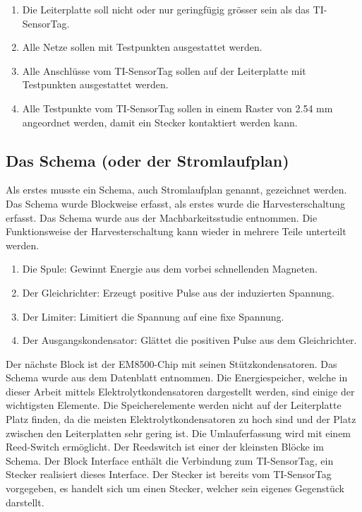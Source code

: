 \begin{enumerate}
    \item Die Leiterplatte soll nicht oder nur geringfügig grösser sein als das TI-SensorTag.
    
    \item Alle Netze sollen mit Testpunkten ausgestattet werden.
    
    \item Alle Anschlüsse vom TI-SensorTag sollen auf der Leiterplatte mit Testpunkten ausgestattet werden.
    
    \item Alle Testpunkte vom TI-SensorTag sollen in einem Raster von 2.54 mm angeordnet werden, damit ein Stecker kontaktiert werden kann.
    
\end{enumerate}
	


\subsection{Das Schema (oder der Stromlaufplan)}
Als erstes musste ein Schema, auch Stromlaufplan genannt, gezeichnet werden. Das Schema wurde Blockweise erfasst, als erstes wurde die Harvesterschaltung erfasst. Das Schema wurde aus der Machbarkeitsstudie entnommen. Die Funktionsweise der Harvesterschaltung kann wieder in mehrere Teile unterteilt werden.

\begin{enumerate}
    \item Die Spule: Gewinnt Energie aus dem vorbei schnellenden Magneten.
    
    \item Der Gleichrichter: Erzeugt positive Pulse aus der induzierten Spannung.
    
    \item Der Limiter: Limitiert die Spannung auf eine fixe Spannung.
    
    \item Der Ausgangskondensator: Glättet die positiven Pulse aus dem Gleichrichter.
    
\end{enumerate}

Der nächste Block ist der EM8500-Chip mit seinen Stützkondensatoren. Das Schema wurde aus dem Datenblatt entnommen. 
Die Energiespeicher, welche in dieser Arbeit mittels Elektrolytkondensatoren dargestellt werden, sind einige der wichtigsten Elemente. Die Speicherelemente werden nicht auf der Leiterplatte Platz finden, da die meisten Elektrolytkondensatoren zu hoch sind und der Platz zwischen den Leiterplatten sehr gering ist. 
Die Umlauferfassung wird mit einem Reed-Switch ermöglicht. Der Reedswitch ist einer der kleinsten Blöcke im Schema.
Der Block Interface enthält die Verbindung zum TI-SensorTag, ein Stecker realisiert dieses Interface. Der Stecker ist bereits vom TI-SensorTag vorgegeben, es handelt sich um einen Stecker, welcher sein eigenes Gegenstück darstellt. 

